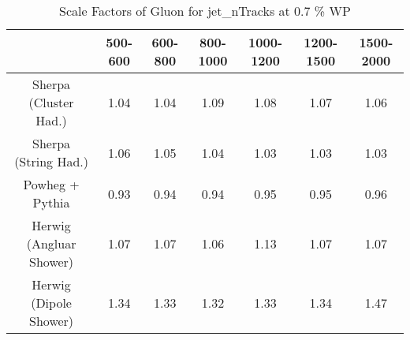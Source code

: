 \begin{table}
\centering
\caption{Scale Factors of Gluon for jet_nTracks at 0.7 \% WP}
\label{tab:SF_MC_jet_nTracks_0.7_Gluon}
\begin{tabular}{ccccccc}
\toprule
{} &  500-600 &  600-800 &  800-1000 &  1000-1200 &  1200-1500 &  1500-2000 \\
\midrule
Sherpa (Cluster Had.)   &     1.04 &     1.04 &      1.09 &       1.08 &       1.07 &       1.06 \\
Sherpa (String Had.)    &     1.06 &     1.05 &      1.04 &       1.03 &       1.03 &       1.03 \\
Powheg + Pythia         &     0.93 &     0.94 &      0.94 &       0.95 &       0.95 &       0.96 \\
Herwig (Angluar Shower) &     1.07 &     1.07 &      1.06 &       1.13 &       1.07 &       1.07 \\
Herwig (Dipole Shower)  &     1.34 &     1.33 &      1.32 &       1.33 &       1.34 &       1.47 \\
\bottomrule
\end{tabular}
\end{table}
